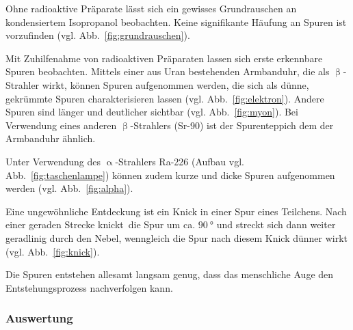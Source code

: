\documentclass[a4paper,12pt]{article}
\newcommand{\figref}[1]{Abb.~\ref{#1}}
\begin{document}
Ohne radioaktive Präparate lässt sich ein gewisses Grundrauschen an kondensiertem Isopropanol beobachten. Keine signifikante Häufung an Spuren ist vorzufinden (vgl. \figref{fig:grundrauschen}). \par
Mit Zuhilfenahme von radioaktiven Präparaten lassen sich erste erkennbare Spuren beobachten. Mittels einer aus Uran bestehenden Armbanduhr, die als $\upbeta$-Strahler wirkt, können Spuren aufgenommen werden, die sich als dünne, gekrümmte Spuren charakterisieren lassen (vgl. \figref{fig:elektron}). Andere Spuren sind länger und deutlicher sichtbar (vgl. \figref{fig:myon}). Bei Verwendung eines anderen $\upbeta$-Strahlers (Sr-90) ist der Spurenteppich dem der Armbanduhr ähnlich. \par
Unter Verwendung des $\upalpha$-Strahlers Ra-226 (Aufbau vgl. \figref{fig:taschenlampe}) können zudem kurze und dicke Spuren aufgenommen werden (vgl. \figref{fig:alpha}). \par
Eine ungewöhnliche Entdeckung ist ein Knick in einer Spur eines Teilchens. Nach einer geraden Strecke \glqq knickt\grqq \ die Spur um ca. $\qty{90}{\degree}$ und streckt sich dann weiter geradlinig durch den Nebel, wenngleich die Spur nach diesem Knick dünner wirkt (vgl. \figref{fig:knick}). \par
Die Spuren entstehen allesamt langsam genug, dass das menschliche Auge den Entstehungsprozess nachverfolgen kann. 



\subsubsection{Auswertung} \label{sssec:254}
\end{document}
